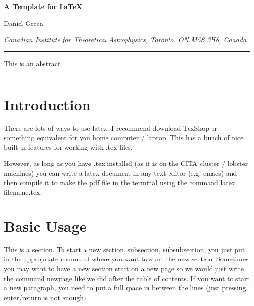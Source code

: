 \documentclass[11pt]{article}
\numberwithin{equation}{section}
\begin{document}
\begin{titlepage}


\begin{center}

{\fontsize{20}{28}\selectfont  \sffamily \bfseries A Template for LaTeX}

\end{center}

\vspace{0.2cm}

\begin{center}
{\fontsize{14}{18}\selectfont  Daniel Green}
\end{center}

\begin{center}
\textsl{ Canadian Institute for Theoretical Astrophysics, Toronto, ON M5S 3H8, Canada}
\end{center}


\vspace{1.2cm}
\hrule \vspace{0.3cm}
This is an abstract
\vskip 10pt
\hrule

\vspace{0.6cm}
\end{titlepage}


\tableofcontents

\newpage 


\section{Introduction}\label{sec:intro}

There are lots of ways to use latex.  I recommend download TexShop or something equivalent for you home computer / laptop.  This has a bunch of nice built in features for working with .tex files.

However, as long as you have .tex installed (as it is on the CITA cluster / lobster machines) you can write a latex document in any text editor (e.g. emacs) and then compile it to make the pdf file in the terminal using the command latex filename.tex.

\section{Basic Usage}\label{sec:basics}
This is a section.  To start a new section, subsection, subsubsection, you just put in the appropriate command where you want to start the new section.  Sometimes you may want to have a new section start on a new page so we would just write the command newpage like we did after the table of contents.
If you want to start a new paragraph, you need to put a full space in between the lines (just pressing enter/return is not enough).
\end{document}
